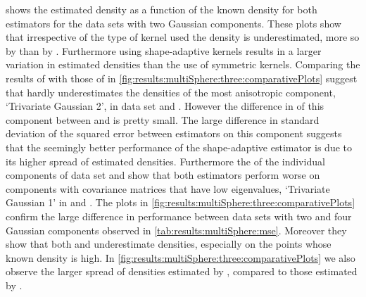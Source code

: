 	 shows the estimated density as a function of the known density for both estimators for the data sets with two Gaussian components. These plots show that irrespective of the type of kernel used the density is underestimated, more so by \mbe than by \sambe. Furthermore using shape-adaptive kernels results in a larger variation in estimated densities than the use of symmetric kernels.
		Comparing the results of \sambe with those of \mbe in \cref{fig:results:multiSphere:three:comparativePlots} suggest that \sambe hardly underestimates the densities of the most anisotropic component, \ie `Trivariate Gaussian 2', in data set \ferdosiTwo and \baakmanTwo. However the difference in \mse of this component between \mbe and \sambe is pretty small. The large difference in standard deviation of the squared error between estimators on this component suggests that the seemingly better performance of the shape-adaptive estimator is due to its higher spread of estimated densities.
		Furthermore the \mses of the individual components of data set \ferdosiTwo and \baakmanThree show that both estimators perform worse on components with covariance matrices that have low eigenvalues, \eg `Trivariate Gaussian 1' in \ferdosiTwo and \baakmanThree.
	The plots in \cref{fig:results:multiSphere:three:comparativePlots} confirm the large difference in performance between data sets with two and four Gaussian components observed in \cref{tab:results:multiSphere:mse}. Moreover they show that both \mbe and \sambe underestimate densities, especially on the points whose known density is high. In \cref{fig:results:multiSphere:three:comparativePlots} we also observe the larger spread of densities estimated by \sambe, compared to those estimated by \mbe.

